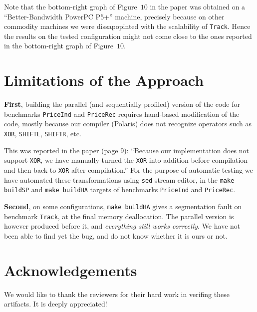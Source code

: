 \documentclass{sig-alternate}
\begin{document}
       Note that the bottom-right graph of Figure~$10$ in the paper was obtained
        on a ``Better-Bandwidth PowerPC P5+'' machine, precisely because on other
        commodity machines we were dissapopinted with the scalability of {\tt Track}. 
        Hence the results on the tested configuration might not come close to 
            the ones reported in the bottom-right graph of Figure~$10$. 

\section{Limitations of the Approach}

{\bf First}, building the parallel (and sequentially profiled) version of the code
            for benchmarks {\tt PriceInd}  and {\tt PriceRec} requires hand-based
            modification of the code, mostly because our compiler (Polaris) 
            does not recognize operators such as {\tt XOR}, {\tt SHIFTL}, {\tt SHIFTR}, etc.

       This was reported in the paper (page 9):
            ``Because our implementation does not support {\tt XOR}, we have manually 
                turned the {\tt XOR} into addition before compilation and then back 
                to {\tt XOR} after compilation.'' 
        For the purpose of automatic testing we have automated these transformations
        using {\tt sed} stream editor, in the {\tt make buildSP} and {\tt make buildHA}
        targets of benchmarks {\tt PriceInd} and {\tt PriceRec}.

{\bf Second}, on some configurations, {\tt make buildHA} gives a segmentation fault
        on benchmark {\tt Track}, at the final memory deallocation. The parallel
        version is however produced before it, and {\em everything still works correctly}.
        We have not been able to find yet the bug, and do not know whether it is ours or not. 

\section{Acknowledgements}
We would like to thank the reviewers for their hard work in verifing these artifacts.
It is deeply appreciated!





%
%
\end{document}
